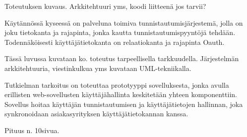 Toteutuksen kuvaus. Arkkitehtuuri yms, koodi liitteenä jos tarvii?

Käytännössä kyseessä on palveluna toimiva tunnistautumisjärjestemä, jolla on joku tietokanta ja rajapinta, jonka kautta tunnistautumispyyntöjä tehdään. Todennäköisesti käyttäjätietokanta on relaatiokanta ja rajapinta Oauth.

Tässä luvussa kuvataan ko. toteutus tarpeellisella tarkkuudella. Järjestelmän arkkitehtuuria, viestinkulkua yms kuvataan UML-tekniikalla.

Tutkielman tarkoitus on toteuttaa prototyyppi sovelluksesta, jonka avulla erillisten web-sovellusten käyttäjähallinta keskitetään yhteen komponenttiin. Sovellus hoitaa käyttäjän tunnistautumisen ja käyttäjätietojen hallinnan, joka synkronoidaan asiakasyrityksen käyttäjätietokannan kanssa. 

Pituus n. 10sivua.
